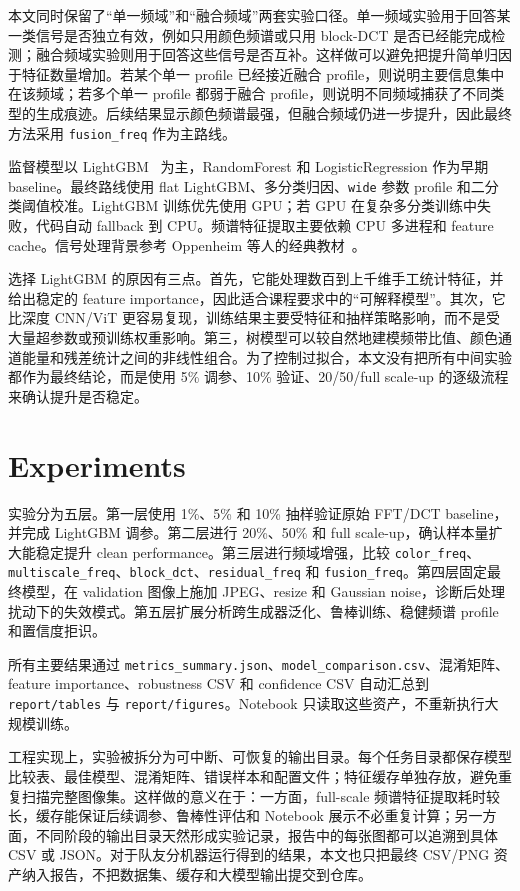 \documentclass[sigconf,nonacm]{acmart}
\begin{document}
本文同时保留了“单一频域”和“融合频域”两套实验口径。单一频域实验用于回答某一类信号是否独立有效，例如只用颜色频谱或只用 block-DCT 是否已经能完成检测；融合频域实验则用于回答这些信号是否互补。这样做可以避免把提升简单归因于特征数量增加。若某个单一 profile 已经接近融合 profile，则说明主要信息集中在该频域；若多个单一 profile 都弱于融合 profile，则说明不同频域捕获了不同类型的生成痕迹。后续结果显示颜色频谱最强，但融合频域仍进一步提升，因此最终方法采用 \texttt{fusion\_freq} 作为主路线。

监督模型以 LightGBM~\cite{ke2017lightgbm} 为主，RandomForest 和 LogisticRegression 作为早期 baseline。最终路线使用 flat LightGBM、多分类归因、\texttt{wide} 参数 profile 和二分类阈值校准。LightGBM 训练优先使用 GPU；若 GPU 在复杂多分类训练中失败，代码自动 fallback 到 CPU。频谱特征提取主要依赖 CPU 多进程和 feature cache。信号处理背景参考 Oppenheim 等人的经典教材~\cite{oppenheim1999discrete}。

选择 LightGBM 的原因有三点。首先，它能处理数百到上千维手工统计特征，并给出稳定的 feature importance，因此适合课程要求中的“可解释模型”。其次，它比深度 CNN/ViT 更容易复现，训练结果主要受特征和抽样策略影响，而不是受大量超参数或预训练权重影响。第三，树模型可以较自然地建模频带比值、颜色通道能量和残差统计之间的非线性组合。为了控制过拟合，本文没有把所有中间实验都作为最终结论，而是使用 5\% 调参、10\% 验证、20/50/full scale-up 的逐级流程来确认提升是否稳定。

\section{Experiments}
实验分为五层。第一层使用 1\%、5\% 和 10\% 抽样验证原始 FFT/DCT baseline，并完成 LightGBM 调参。第二层进行 20\%、50\% 和 full scale-up，确认样本量扩大能稳定提升 clean performance。第三层进行频域增强，比较 \texttt{color\_freq}、\texttt{multiscale\_freq}、\texttt{block\_dct}、\texttt{residual\_freq} 和 \texttt{fusion\_freq}。第四层固定最终模型，在 validation 图像上施加 JPEG、resize 和 Gaussian noise，诊断后处理扰动下的失效模式。第五层扩展分析跨生成器泛化、鲁棒训练、稳健频谱 profile 和置信度拒识。

所有主要结果通过 \texttt{metrics\_summary.json}、\texttt{model\_comparison.csv}、混淆矩阵、feature importance、robustness CSV 和 confidence CSV 自动汇总到 \texttt{report/tables} 与 \texttt{report/figures}。Notebook 只读取这些资产，不重新执行大规模训练。

工程实现上，实验被拆分为可中断、可恢复的输出目录。每个任务目录都保存模型比较表、最佳模型、混淆矩阵、错误样本和配置文件；特征缓存单独存放，避免重复扫描完整图像集。这样做的意义在于：一方面，full-scale 频谱特征提取耗时较长，缓存能保证后续调参、鲁棒性评估和 Notebook 展示不必重复计算；另一方面，不同阶段的输出目录天然形成实验记录，报告中的每张图都可以追溯到具体 CSV 或 JSON。对于队友分机器运行得到的结果，本文也只把最终 CSV/PNG 资产纳入报告，不把数据集、缓存和大模型输出提交到仓库。
\end{document}
